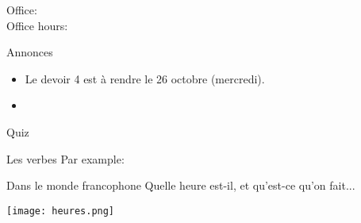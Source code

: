 \documentclass{beamer}
\subtitle[Heures et verbes \lexi{-ir}]{Les heures et les verbes \lexi{-ir}}
\begin{document}
  \begin{frame}
    \titlepage
    \tiny{Office: \\
          Office hours: }
  \end{frame}

  \begin{frame}{Annonces}
    \begin{itemize}
      \item Le devoir 4 est à rendre le 26 octobre (mercredi).
      \item[] 
    \end{itemize}
  \end{frame}

  \begin{frame}{}
    \begin{center}
      \Large Quiz
    \end{center}
  \end{frame}

  \begin{frame}{Les verbes }
    Par example:
    \begin{center}
      
    \end{center}
  \end{frame}

  \begin{frame}{Dans le monde francophone}
    Quelle heure est-il, et qu'est-ce qu'on fait...
    \begin{center}
      \texttt{[image: heures.png]}
    \end{center}
  \end{frame}
\end{document}

